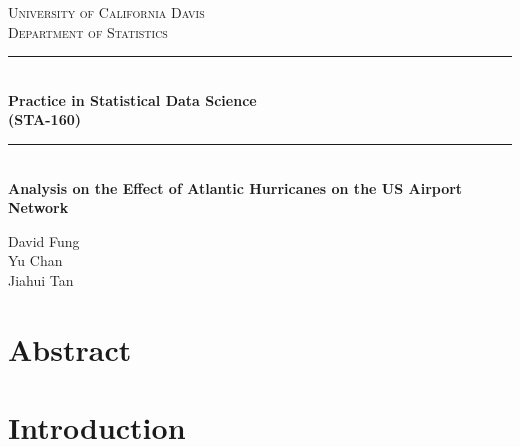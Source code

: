 \documentclass[12pt]{article}
\begin{document}
\begin{titlepage}

\newcommand{\HRule}{\rule{\linewidth}{0.5mm}} %

\center %
 

\textsc{\LARGE University of California Davis }\\[0.3cm] 
\textsc{\Large Department of Statistics}\\[0.5cm] 


\HRule \\[0.4cm]
{ \huge \bfseries Practice in Statistical Data Science\\  (STA-160)}\\[0.03cm]
\HRule \\[1.5cm]

\hfill \break \hfill \break \hfill \break
{ \huge \bfseries Analysis on the Effect of Atlantic Hurricanes on the US Airport Network}\\
\hfill \break \hfill \break \hfill \break
\hfill \break

{\large David Fung \\ Yu Chan\\ Jiahui Tan}\\
 

\vfill %

\end{titlepage}

\newpage
\tableofcontents
\newpage
\section{Abstract} \label{sec:Abstract}
\section{Introduction} \label{sec:Intro}
\end{document}
